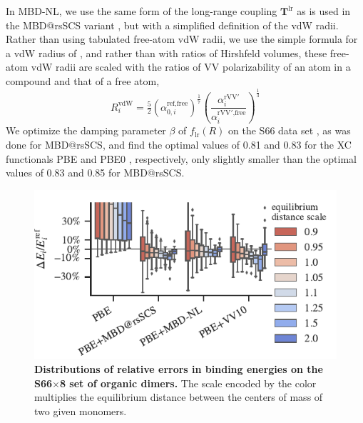 In MBD-NL, we use the same form of the long-range coupling $\mathbf T^\text{lr}$ as is used in the MBD@rsSCS variant \citep{AmbrosettiJCP14}, but with a simplified definition of the vdW radii.
Rather than using tabulated free-atom vdW radii, we use the simple formula for a vdW radius of \citet{FedorovPRL18}, and rather than with ratios of Hirshfeld volumes, these free-atom vdW radii are scaled with the ratios of VV polarizability of an atom in a compound and that of a free atom,\begin{equation}
  R_i^\text{vdW}=\tfrac52{(\alpha_{0,i}^\text{ref,free})}^\frac17{\left(\frac{\alpha_i^\mathrm{rVV'}}{\alpha_i^\text{rVV$'$,free}}\right)}^\frac13
\end{equation}
We optimize the damping parameter $\beta$ of $f_\text{lr}(R)$ on the S66 data set \citep{RezacJCTC11}, as was done for MBD@rsSCS, and find the optimal values of 0.81 and 0.83 for the XC functionals PBE \citep{PerdewPRL96} and PBE0 \citep{AdamoJCP99}, respectively, only slightly smaller than the optimal values of 0.83 and 0.85 for MBD@rsSCS.


\begin{figure}[t!]
\centering
\includegraphics{../media/s66-errors.pdf}
\caption{\textbf{Distributions of relative errors in binding energies on the S66$\times$8 set of organic dimers.}
The scale encoded by the color multiplies the equilibrium distance between the centers of mass of two given monomers.
}\label{fig:s66-errors}
\end{figure}

